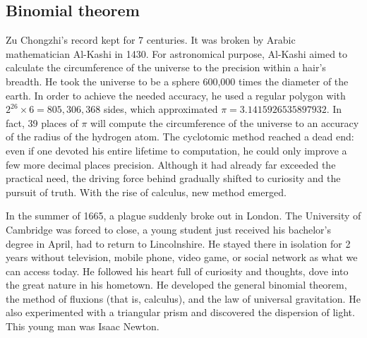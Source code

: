 \documentclass[b5paper]{article}
\begin{document}
\subsection{Binomial theorem}
Zu Chongzhi's record kept for 7 centuries. It was broken by Arabic mathematician Al-Kashi in 1430. For astronomical purpose, Al-Kashi aimed to calculate the circumference of the universe to the precision within a hair's breadth. He took the universe to be a sphere 600,000 times the diameter of the earth. In order to achieve the needed accuracy, he used a regular polygon with $2^{26} \times 6 = 805,306,368$ sides, which approximated $\pi = 3.1415926535897932$. In fact, 39 places of $\pi$ will compute the circumference of the universe to an accuracy of the radius of the hydrogen atom. The cyclotomic method reached a dead end: even if one devoted his entire lifetime to computation, he could only improve a few more decimal places precision. Although it had already far exceeded the practical need, the driving force behind gradually shifted to curiosity and the pursuit of truth. With the rise of calculus, new method emerged.

In the summer of 1665, a plague suddenly broke out in London. The University of Cambridge was forced to close, a young student just received his bachelor's degree in April, had to return to Lincolnshire. He stayed there in isolation for 2 years without television, mobile phone, video game, or social network as what we can access today. He followed his heart full of curiosity and thoughts, dove into the great nature in his hometown. He developed the general binomial theorem, the method of fluxions (that is, calculus), and the law of universal gravitation. He also experimented with a triangular prism and discovered the dispersion of light. This young man was Isaac Newton.
\end{document}
